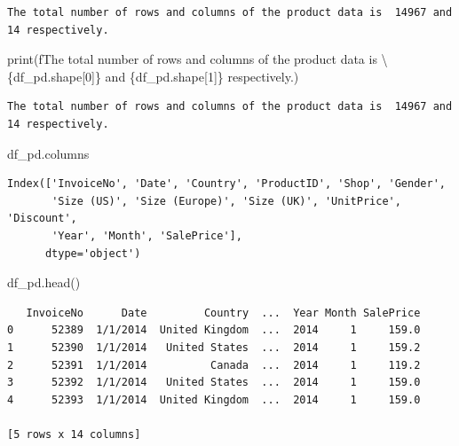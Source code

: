\documentclass[
  letterpaper,
  DIV=11,
  numbers=noendperiod]{scrreprt}
\newenvironment{Shaded}{\begin{snugshade}}{\end{snugshade}}
\newcommand{\BuiltInTok}[1]{\textcolor[rgb]{0.00,0.23,0.31}{#1}}
\newcommand{\DecValTok}[1]{\textcolor[rgb]{0.68,0.00,0.00}{#1}}
\newcommand{\NormalTok}[1]{\textcolor[rgb]{0.00,0.23,0.31}{#1}}
\newcommand{\OperatorTok}[1]{\textcolor[rgb]{0.37,0.37,0.37}{#1}}
\newcommand{\SpecialCharTok}[1]{\textcolor[rgb]{0.37,0.37,0.37}{#1}}
\newcommand{\SpecialStringTok}[1]{\textcolor[rgb]{0.13,0.47,0.30}{#1}}
\begin{document}
\begin{verbatim}
The total number of rows and columns of the product data is  14967 and 14 respectively.
\end{verbatim}

\begin{Shaded}
\begin{Highlighting}[]
\BuiltInTok{print}\NormalTok{(}\SpecialStringTok{f\textquotesingle{}The total number of rows and columns of the product data is }\OperatorTok{\textbackslash{}}
\SpecialStringTok{ }\SpecialCharTok{\{}\NormalTok{df\_pd}\SpecialCharTok{.}\NormalTok{shape[}\DecValTok{0}\NormalTok{]}\SpecialCharTok{\}}\SpecialStringTok{ and }\SpecialCharTok{\{}\NormalTok{df\_pd}\SpecialCharTok{.}\NormalTok{shape[}\DecValTok{1}\NormalTok{]}\SpecialCharTok{\}}\SpecialStringTok{ respectively.\textquotesingle{}}\NormalTok{)}
\end{Highlighting}
\end{Shaded}

\begin{verbatim}
The total number of rows and columns of the product data is  14967 and 14 respectively.
\end{verbatim}

\begin{Shaded}
\begin{Highlighting}[]
\NormalTok{df\_pd.columns}
\end{Highlighting}
\end{Shaded}

\begin{verbatim}
Index(['InvoiceNo', 'Date', 'Country', 'ProductID', 'Shop', 'Gender',
       'Size (US)', 'Size (Europe)', 'Size (UK)', 'UnitPrice', 'Discount',
       'Year', 'Month', 'SalePrice'],
      dtype='object')
\end{verbatim}

\begin{Shaded}
\begin{Highlighting}[]
\NormalTok{df\_pd.head()}
\end{Highlighting}
\end{Shaded}

\begin{verbatim}
   InvoiceNo      Date         Country  ...  Year Month SalePrice
0      52389  1/1/2014  United Kingdom  ...  2014     1     159.0
1      52390  1/1/2014   United States  ...  2014     1     159.2
2      52391  1/1/2014          Canada  ...  2014     1     119.2
3      52392  1/1/2014   United States  ...  2014     1     159.0
4      52393  1/1/2014  United Kingdom  ...  2014     1     159.0

[5 rows x 14 columns]
\end{verbatim}
\end{document}
